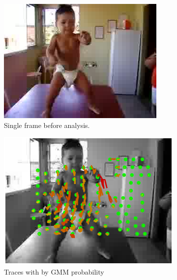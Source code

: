 \begin{figure}[tb]
	\centering
	\begin{subfigure}[b]{0.33\textwidth}
		\centering
		\includegraphics[width=0.9\textwidth]{figs/bimbodance-image50.jpg}
		\caption{Single frame before analysis.}
	\end{subfigure}%
	\begin{subfigure}[b]{0.33\textwidth}
		\centering
		\includegraphics[width=1.2\textwidth]{figs/bimbodance-50.eps}
		\caption{Traces with by GMM probability}
	\end{subfigure}%
	\begin{subfigure}[b]{0.33\textwidth}
		\centering

\end{subfigure}
\end{figure}
